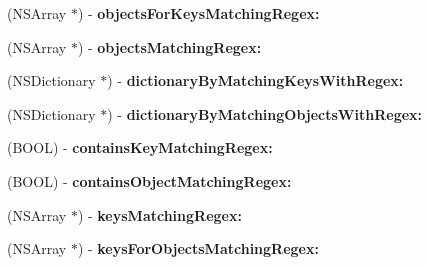 \begin{DoxyCompactItemize}
\item 
\hypertarget{interface_n_s_dictionary_07_regex_kit_additions_08_a2654f85f2a52134280d5aabaef4013b8}{(N\-S\-Array $\ast$) -\/ {\bfseries objects\-For\-Keys\-Matching\-Regex\-:}}\label{interface_n_s_dictionary_07_regex_kit_additions_08_a2654f85f2a52134280d5aabaef4013b8}

\item 
\hypertarget{interface_n_s_dictionary_07_regex_kit_additions_08_a5e920d8e766291e735c7b3db3947833d}{(N\-S\-Array $\ast$) -\/ {\bfseries objects\-Matching\-Regex\-:}}\label{interface_n_s_dictionary_07_regex_kit_additions_08_a5e920d8e766291e735c7b3db3947833d}

\item 
\hypertarget{interface_n_s_dictionary_07_regex_kit_additions_08_aeac2aa450651b76ebd183ed6e37bcb32}{(N\-S\-Dictionary $\ast$) -\/ {\bfseries dictionary\-By\-Matching\-Keys\-With\-Regex\-:}}\label{interface_n_s_dictionary_07_regex_kit_additions_08_aeac2aa450651b76ebd183ed6e37bcb32}

\item 
\hypertarget{interface_n_s_dictionary_07_regex_kit_additions_08_aba1641ff6e105b27c920dddf09515fd1}{(N\-S\-Dictionary $\ast$) -\/ {\bfseries dictionary\-By\-Matching\-Objects\-With\-Regex\-:}}\label{interface_n_s_dictionary_07_regex_kit_additions_08_aba1641ff6e105b27c920dddf09515fd1}

\item 
\hypertarget{interface_n_s_dictionary_07_regex_kit_additions_08_affebe799174dde6995d30f9ff3f01dee}{(B\-O\-O\-L) -\/ {\bfseries contains\-Key\-Matching\-Regex\-:}}\label{interface_n_s_dictionary_07_regex_kit_additions_08_affebe799174dde6995d30f9ff3f01dee}

\item 
\hypertarget{interface_n_s_dictionary_07_regex_kit_additions_08_a98f34268790196f820e428a7acb2d062}{(B\-O\-O\-L) -\/ {\bfseries contains\-Object\-Matching\-Regex\-:}}\label{interface_n_s_dictionary_07_regex_kit_additions_08_a98f34268790196f820e428a7acb2d062}

\item 
\hypertarget{interface_n_s_dictionary_07_regex_kit_additions_08_a49335862d9824a69981b036a5d2eb0d8}{(N\-S\-Array $\ast$) -\/ {\bfseries keys\-Matching\-Regex\-:}}\label{interface_n_s_dictionary_07_regex_kit_additions_08_a49335862d9824a69981b036a5d2eb0d8}

\item 
\hypertarget{interface_n_s_dictionary_07_regex_kit_additions_08_a81036aeb29611e6ad3eda99dfbe677f0}{(N\-S\-Array $\ast$) -\/ {\bfseries keys\-For\-Objects\-Matching\-Regex\-:}}\label{interface_n_s_dictionary_07_regex_kit_additions_08_a81036aeb29611e6ad3eda99dfbe677f0}


\end{DoxyCompactItemize}
